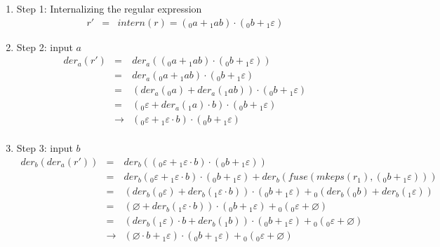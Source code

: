 \documentclass[12pt]{article}
\newcommand{\der}{\textit{der}}
\newcommand{\fuse}{\textit{fuse}}
\newcommand{\mkeps}{\textit{mkeps}}
\newcommand{\intern}{\textit{intern}}
\begin{document}
\begin{enumerate}
  \item Step 1: Internalizing the regular expression
  \[
    \begin{array}{rcl}
    r' & = & \intern(r) = ({}_0a + {}_1ab) \cdot ({}_0b + {}_1\varepsilon)
    \end{array}
  \]

  \item Step 2: input $a$
    \[
    \begin{array}{rcl}
    \der_a (r') & =           & \der_a(({}_0a + {}_1ab) \cdot ({}_0b + {}_1\varepsilon))\\
                & =           & \der_a({}_0a + {}_1ab) \cdot ({}_0b + {}_1\varepsilon)\\
                & =           & (\der_a({}_0a) + \der_a({}_1ab)) \cdot ({}_0b + {}_1\varepsilon)\\
                & =           & ({}_0\varepsilon + \der_a({}_1a) \cdot b ) \cdot ({}_0b + {}_1\varepsilon)\\
                & \rightarrow & ({}_0\varepsilon + {}_1\varepsilon \cdot b) \cdot ({}_0b + {}_1\varepsilon)\\
    \end{array}
    \]

  \item Step 3: input $b$
  \[
    \begin{array}{rcl}
    \der_b(\der_a(r')) & =           & \der_b(({}_0\varepsilon + {}_1\varepsilon \cdot b) \cdot ({}_0b + {}_1\varepsilon))\\
                       & =           & \der_b({}_0\varepsilon + {}_1\varepsilon \cdot b) \cdot ({}_0b + {}_1\varepsilon) + \der_b(\fuse(\mkeps(r_1),({}_0b + {}_1\varepsilon))) \\
                       & =           & (\der_b({}_0\varepsilon) + \der_b({}_1\varepsilon \cdot b)) \cdot ({}_0b + {}_1\varepsilon) + {}_0(\der_b({}_0b) + \der_b({}_1\varepsilon)) \\
                       & =           & (\varnothing + \der_b({}_1\varepsilon \cdot b)) \cdot ({}_0b + {}_1\varepsilon) + {}_0({}_0\varepsilon + \varnothing) \\
                       & =           & (\der_b({}_1\varepsilon)\cdot b + \der_b({}_1b)) \cdot ({}_0b + {}_1\varepsilon) + {}_0({}_0\varepsilon + \varnothing) \\
                       & \rightarrow & (\varnothing \cdot b + {}_1\varepsilon) \cdot ({}_0b + {}_1\varepsilon) + {}_0({}_0\varepsilon + \varnothing) \\
    \end{array}
  \]

\end{enumerate}
\end{document}
